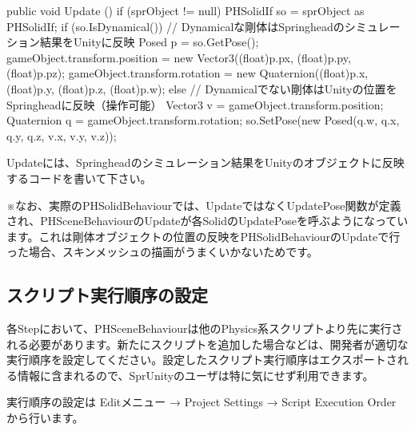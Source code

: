\begin{sourcecode}
    public void Update () {
        if (sprObject != null) {
            PHSolidIf so = sprObject as PHSolidIf;
            if (so.IsDynamical()) {
                // Dynamicalな剛体はSpringheadのシミュレーション結果をUnityに反映
                Posed p = so.GetPose();
                gameObject.transform.position = new Vector3((float)p.px, (float)p.py, (float)p.pz);
                gameObject.transform.rotation = new Quaternion((float)p.x, (float)p.y, (float)p.z, (float)p.w);
            } else {
                // Dynamicalでない剛体はUnityの位置をSpringheadに反映（操作可能）
                Vector3 v = gameObject.transform.position;
                Quaternion q = gameObject.transform.rotation;
                so.SetPose(new Posed(q.w, q.x, q.y, q.z, v.x, v.y, v.z));
            }
        }
    }
\end{sourcecode}

Update\KLUDGE には、Springhead\KLUDGE のシミュレーション結果をUnity\KLUDGE のオブジェクトに反映するコードを書いて下さい。

\KLUDGE ※なお、実際のPHSolidBehaviour\KLUDGE では、Update\KLUDGE ではなくUpdatePose\KLUDGE 関数が定義され、PHSceneBehaviour\KLUDGE のUpdate\KLUDGE が各Solid\KLUDGE のUpdatePose\KLUDGE を呼ぶようになっています。これは剛体オブジェクトの位置の反映をPHSolidBehaviour\KLUDGE のUpdate\KLUDGE で行った場合、スキンメッシュの描画がうまくいかないためです。


\subsection{\KLUDGE スクリプト実行順序の設定}

\KLUDGE 各Step\KLUDGE において、PHSceneBehaviour\KLUDGE は他のPhysics\KLUDGE 系スクリプトより先に実行される必要があります。新たにスクリプトを追加した場合などは、開発者が適切な実行順序を設定してください。設定したスクリプト実行順序はエクスポートされる情報に含まれるので、SprUnity\KLUDGE のユーザは特に気にせず利用できます。

\KLUDGE 実行順序の設定は Edit\KLUDGE メニュー \KLUDGE → Project Settings \KLUDGE → Script Execution Order \KLUDGE から行います。




